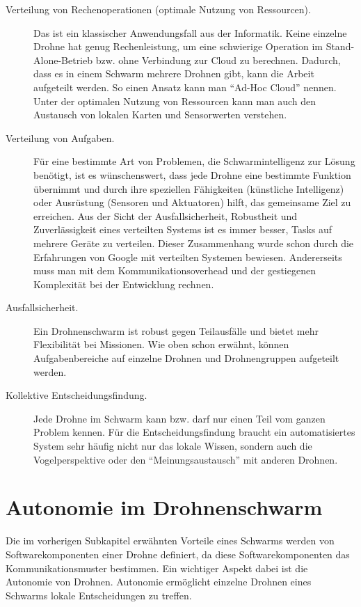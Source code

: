 \begin{description} 
	\item[Verteilung von Rechenoperationen (optimale Nutzung von Ressourcen).] Das ist ein klassischer Anwendungsfall aus der Informatik. Keine einzelne Drohne hat genug Rechenleistung, um eine schwierige Operation im Stand-Alone-Betrieb bzw. ohne Verbindung zur Cloud zu berechnen. Dadurch, dass es in einem Schwarm mehrere Drohnen gibt, kann die Arbeit aufgeteilt werden. So einen Ansatz kann man “Ad-Hoc Cloud” nennen. Unter der optimalen Nutzung von Ressourcen kann man auch den Austausch von lokalen Karten und Sensorwerten verstehen.
	
	\item[Verteilung von Aufgaben.] Für eine bestimmte Art von Problemen, die Schwarmintelligenz zur Lösung benötigt, ist es wünschenswert, dass jede Drohne eine bestimmte Funktion übernimmt und durch ihre speziellen Fähigkeiten (künstliche Intelligenz) oder Ausrüstung (Sensoren und Aktuatoren) hilft, das gemeinsame Ziel zu erreichen.
	Aus der Sicht der Ausfallsicherheit, Robustheit und Zuverlässigkeit eines verteilten Systems ist es immer besser, Tasks auf mehrere Geräte zu verteilen.  Dieser Zusammenhang wurde schon durch die Erfahrungen von Google mit verteilten Systemen bewiesen. Andererseits muss man mit dem Kommunikationsoverhead und der gestiegenen Komplexität bei der Entwicklung rechnen.
	
	\item[Ausfallsicherheit.] Ein Drohnenschwarm ist robust gegen Teilausfälle und bietet mehr Flexibilität bei Missionen. Wie oben schon erwähnt, können Aufgabenbereiche auf einzelne Drohnen und Drohnengruppen aufgeteilt werden.
	
	\item[Kollektive Entscheidungsfindung.]	Jede Drohne im Schwarm kann bzw. darf nur einen Teil vom ganzen Problem kennen. Für die Entscheidungsfindung braucht ein automatisiertes System sehr häufig nicht nur das lokale Wissen, sondern auch die Vogelperspektive oder den “Meinungsaustausch” mit anderen Drohnen.
\end{description}

\section{Autonomie im Drohnenschwarm}

Die im vorherigen Subkapitel erwähnten Vorteile eines Schwarms werden von Softwarekomponenten einer Drohne definiert, da diese Softwarekomponenten das Kommunikationsmuster bestimmen. Ein wichtiger Aspekt dabei ist die Autonomie von Drohnen. Autonomie ermöglicht einzelne Drohnen eines Schwarms lokale Entscheidungen zu treffen. 

